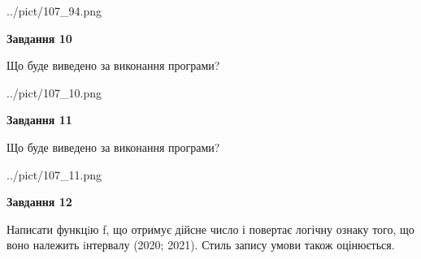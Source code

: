 \documentclass[12pt, ukrainian]{article}
\begin{document}
{\begin {large}
\begin{center}
	{../pict/107_94.png}
\end{center}
\newpage

{\begin {center}\textbf{Завдання 10}\end {center}}

Що буде виведено за виконання програми?\par
\begin{center}
	{../pict/107_10.png}
\end{center}
\newpage

{\begin {center}\textbf{Завдання 11}\end {center}}

Що буде виведено за виконання програми?\par
\begin{center}
	{../pict/107_11.png}
\end{center}
\newpage

{\begin {center}\textbf{Завдання 12}\end {center}}


Написати функцiю f, що отримує дійсне число і повертає логічну ознаку того, що воно належить iнтервалу (2020; 2021). Стиль запису умови також оцінюється.\par
\newpage

\end {large}}
\end{document}
